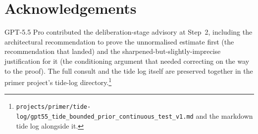 \documentclass[11pt]{article}
\begin{document}
\section*{Acknowledgements}

GPT-5.5 Pro contributed the deliberation-stage advisory at Step~2,
including the architectural recommendation to prove the unnormalised
estimate first (the recommendation that landed) and the
sharpened-but-slightly-imprecise justification for it (the conditioning
argument that needed correcting on the way to the proof). The full consult
and the tide log itself are preserved together in the primer project's
tide-log directory.\footnote{\texttt{projects/primer/tide-log/}\allowbreak\texttt{gpt55\_tide\_bounded\_prior\_continuous\_test\_v1.md}
and the markdown tide log alongside it.}
\end{document}
